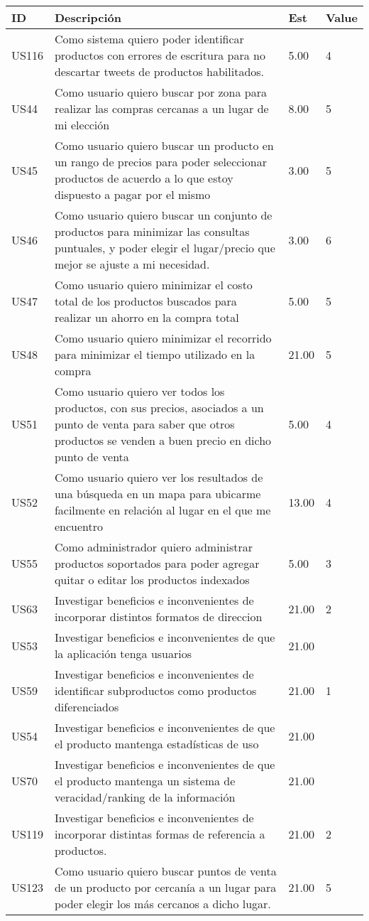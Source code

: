 \documentclass[a4paper,8pt]{article}
\begin{document}
\begin{tabular}{|p{1cm}|p{10cm}|p{1cm}|p{1cm}|}
\hline
\hline
\textbf{ID}&\textbf{Descripción}&\textbf{Est}&\textbf{Value}\\
\hline
\hline
US116& Como sistema quiero poder identificar productos con errores de escritura para no descartar tweets de productos habilitados. &5.00&4\\ 
\hline
US44 &Como usuario quiero buscar por zona para realizar las compras cercanas a un lugar de mi elección &8.00&5\\ 
\hline	
US45 &Como usuario quiero buscar un producto en un rango de precios para poder seleccionar productos de acuerdo a lo que estoy dispuesto a pagar por el mismo &3.00&5\\ 
\hline	
US46 &Como usuario quiero buscar un conjunto de productos para minimizar las consultas puntuales, y poder elegir el lugar/precio que mejor se ajuste a mi necesidad. &3.00&6\\ 
\hline	
US47 &Como usuario quiero minimizar el costo total de los productos buscados para realizar un ahorro en la compra total &5.00&5\\ 
\hline	
US48 &Como usuario quiero minimizar el recorrido para minimizar el tiempo utilizado en la compra &21.00&5\\ 
\hline	
US51 &Como usuario quiero ver todos los productos, con sus precios, asociados a un punto de venta para saber que otros productos se venden a buen precio en dicho punto de venta &5.00&4\\ 
\hline	
US52 &Como usuario quiero ver los resultados de una búsqueda en un mapa para ubicarme facilmente en relación al lugar en el que me encuentro& 13.00&4\\ 
\hline
US55 &Como administrador quiero administrar productos soportados para poder agregar quitar o editar los productos indexados &5.00&3\\ 
\hline
US63 &Investigar beneficios e inconvenientes de incorporar distintos formatos de direccion &21.00&2\\ 
\hline
US53 &Investigar beneficios e inconvenientes de que la aplicación tenga usuarios& 21.00&\\ 
\hline	
US59 &Investigar beneficios e inconvenientes de identificar subproductos como productos diferenciados &21.00&1\\ 
\hline		
US54 &Investigar beneficios e inconvenientes de que el producto mantenga estadísticas de uso &21.00&\\ 
\hline	
US70 &Investigar beneficios e inconvenientes de que el producto mantenga un sistema de veracidad/ranking de la información &21.00&\\ 	
\hline	
US119 &Investigar beneficios e inconvenientes de incorporar distintas formas de referencia a productos. &21.00&2\\ 
\hline		
US123 &Como usuario quiero buscar puntos de venta de un producto por cercaní­a a un lugar para poder elegir los más cercanos a dicho lugar. &21.00&5\\ 
\hline
\hline
\end{tabular}
\newpage
\end{document}
